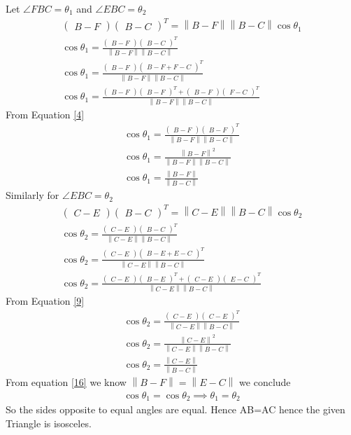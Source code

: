 \documentclass[journal,12pt,twocolumn]{IEEEtran}
\newcommand{\myvec}[1]{\ensuremath{\begin{pmatrix}#1\end{pmatrix}}}
\newcommand{\norm}[1]{\left\lVert#1\right\rVert}
\begin{document}
    Let $\angle FBC=\theta_1$  and  $\angle EBC=\theta_2$
    \begin{align}
        \myvec{B-F}\myvec{B-C}^T=\norm{B-F}\norm{B-C}\cos\theta_1\\
        \cos{\theta_1}=\frac{\myvec{B-F}\myvec{B-C}^T}{\norm{B-F}\norm{B-C}}\\
        \cos{\theta_1}=\frac{\myvec{B-F}\myvec{B-F+F-C}^T}{\norm{B-F}\norm{B-C}}\\
        \cos{\theta_1}=\frac{\myvec{B-F}\myvec{B-F}^T +\myvec{B-F}\myvec{F-C}^T}{\norm{B-F}\norm{B-C}}
        \end{align}
        From Equation {\ref{4}}
        \begin{align}
          \cos{\theta_1}=\frac{\myvec{B-F}\myvec{B-F}^T}{\norm{B-F}\norm{B-C}} \\
          \cos{\theta_1}=\frac{\norm{B-F}^2}{\norm{B-F}\norm{B-C}}\\
          \cos{\theta_1}=\frac{\norm{B-F}}{\norm{B-C}}
        \end{align}
        Similarly for $\angle EBC=\theta_2$
        \begin{align}
        \myvec{C-E}\myvec{B-C}^T=\norm{C-E}\norm{B-C}\cos\theta_2\\
        \cos{\theta_2}=\frac{\myvec{C-E}\myvec{B-C}^T}{\norm{C-E}\norm{B-C}}\\
        \cos{\theta_2}=\frac{\myvec{C-E}\myvec{B-E+E-C}^T}{\norm{C-E}\norm{B-C}}\\
        \cos{\theta_2}=\frac{\myvec{C-E}\myvec{B-E}^T +\myvec{C-E}\myvec{E-C}^T}{\norm{C-E}\norm{B-C}}
        \end{align}
        From Equation {\ref{9}}
        \begin{align}
          \cos{\theta_2}=\frac{\myvec{C-E}\myvec{C-E}^T}{\norm{C-E}\norm{B-C}} \\
          \cos{\theta_2}=\frac{\norm{C-E}^2}{\norm{C-E}\norm{B-C}}\\
          \cos{\theta_2}=\frac{\norm{C-E}}{\norm{B-C}}
        \end{align}
        From equation \ref{16} we know $\norm{B-F}=\norm{E-C}$ we conclude
        \begin{align}
            \cos\theta_1=\cos\theta_2
            \implies\theta_1=\theta_2
        \end{align}
        So the sides opposite to equal angles are equal. Hence AB=AC hence the given Triangle is isosceles.
    
\end{document}
